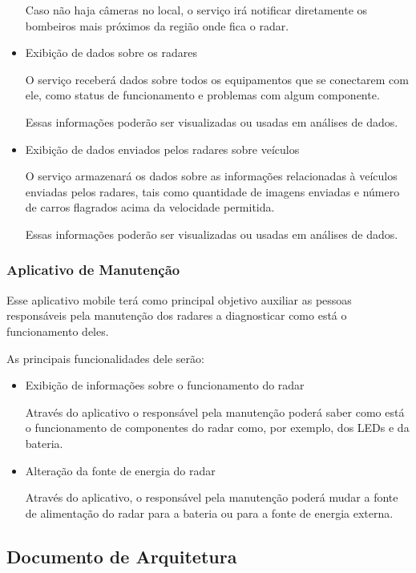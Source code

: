 \begin{itemize}
Caso não haja câmeras no local, o serviço irá notificar diretamente os bombeiros mais próximos da região onde fica o radar.

\item{Exibição de dados sobre os radares}

O serviço receberá dados sobre todos os equipamentos que se conectarem com ele, como status de funcionamento e problemas com algum componente.

Essas informações poderão ser visualizadas ou usadas em análises de dados.

\item{Exibição de dados enviados pelos radares sobre veículos}

O serviço armazenará os dados sobre as informações relacionadas à veículos enviadas pelos radares, tais como quantidade de imagens enviadas e número de carros flagrados acima da velocidade permitida.

Essas informações poderão ser visualizadas ou usadas em análises de dados.
\end{itemize}

\subsubsection{Aplicativo de Manutenção}

Esse aplicativo mobile terá como principal objetivo auxiliar as pessoas responsáveis pela manutenção dos radares a diagnosticar como está o funcionamento deles.

As principais funcionalidades dele serão:

\begin{itemize}


\item{Exibição de informações sobre o funcionamento do radar}

Através do aplicativo o responsável pela manutenção poderá saber como está o funcionamento de componentes do radar como, por exemplo, dos LEDs e da bateria.

\item{Alteração da fonte de energia do radar}

Através do aplicativo, o responsável pela manutenção poderá mudar a fonte de alimentação do radar para a bateria ou para a fonte de energia externa.

\end{itemize}

\subsection{Documento de Arquitetura}\label{documento-de-arquitetura}

